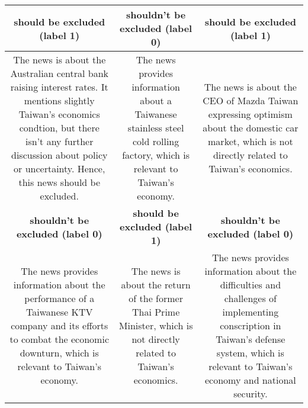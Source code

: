 {
\def\sym#1{\ifmmode^{#1}\else\(^{#1}\)\fi}
\begin{tabularx}{\textwidth}{|C|C|C|}
\hline

\textbf{should be excluded (label 1)} & 
\textbf{shouldn't be excluded (label 0)} & 
\textbf{should be excluded (label 1)}\\
\hline
The news is about the Australian central bank raising interest rates. It mentions slightly Taiwan’s economics condtion, but there isn’t any further discussion about policy or uncertainty. Hence, this news should be excluded.
&
The news provides information about a Taiwanese stainless steel cold rolling factory, which is relevant to Taiwan’s economy.
&
The news is about the CEO of Mazda Taiwan expressing optimism about the domestic car market, which is not directly related to Taiwan’s economics.
\\
\hline

\textbf{shouldn't be excluded (label 0)} & 
\textbf{should be excluded (label 1)} &
\textbf{shouldn't be excluded (label 0)}\\
\hline
The news provides information about the performance of a Taiwanese KTV company and its efforts to combat the economic downturn, which is relevant to Taiwan’s economy.
&
The news is about the return of the former Thai Prime Minister, which is not directly related to Taiwan’s economics.
&
The news provides information about the difficulties and challenges of implementing conscription in Taiwan’s defense system, which is relevant to Taiwan’s economy and national security.
\\
\hline
\end{tabularx}
}
